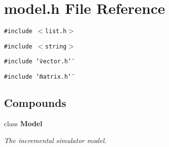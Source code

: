 \section{model.h File Reference}
\label{model_h}
{\tt \#include $<$list.h$>$}\par
{\tt \#include $<$string$>$}\par
{\tt \#include \char`\"{}vector.h\char`\"{}}\par
{\tt \#include \char`\"{}matrix.h\char`\"{}}\par
\subsection*{Compounds}
\begin{CompactItemize}
\item 
class {\bf Model}
\begin{CompactList}\small\item\em The incremental simulator model.\item\end{CompactList}\end{CompactItemize}
